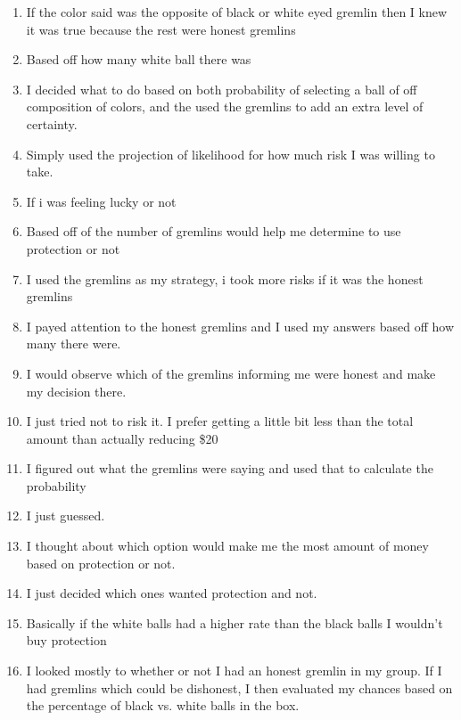 \documentclass[12pt,a4paper]{article}
\begin{document}
\begin{appendices}
\begin{enumerate}
\item If the color said was the opposite of black or white eyed gremlin then I knew it was true because the rest were honest gremlins

\item Based off how many white ball there was

\item I decided what to do based on both probability of selecting a ball of off composition of colors, and the used the gremlins to add an extra level of certainty.

\item Simply used the projection of likelihood for how much risk I was willing to take.

\item If i was feeling lucky or not

\item Based off of the number of gremlins would help me determine to use protection or not

\item I used the gremlins as my strategy, i took more risks if it was the honest gremlins

\item I payed attention to the honest gremlins and I used my answers based off how many there were.

\item I would observe which of the gremlins informing me were honest and make my decision there.

\item I just tried not to risk it. I prefer getting a little bit less than the total amount than actually reducing \$20

\item I figured out what the gremlins were saying and used that to calculate the probability

\item I just guessed.

\item I thought about which option would make me the most amount of money based on protection or not.

\item I just decided which ones wanted protection and not.

\item Basically if the white balls had a higher rate than the black balls I wouldn't buy protection

\item I looked mostly to whether or not I had an honest gremlin in my group. If I had gremlins which could be dishonest, I then evaluated my chances based on the percentage of black vs. white balls in the box.


\end{enumerate}
\end{appendices}
\end{document}
